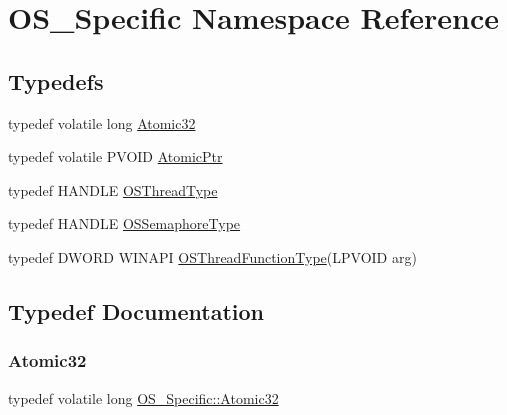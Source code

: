 \hypertarget{namespace_o_s___specific}{}\section{O\+S\+\_\+\+Specific Namespace Reference}
\label{namespace_o_s___specific}
\subsection*{Typedefs}
\begin{DoxyCompactItemize}
\item 
typedef volatile long \hyperlink{namespace_o_s___specific_ae0c154d740b3e6f81b245ff564b7d0ad}{Atomic32}
\item 
typedef volatile P\+V\+O\+ID \hyperlink{namespace_o_s___specific_ad9a39cdf74334e1457fda6bb1c4cb505}{Atomic\+Ptr}
\item 
typedef H\+A\+N\+D\+LE \hyperlink{namespace_o_s___specific_a965d89d27f3b632fa8d2d1b593bf2bd6}{O\+S\+Thread\+Type}
\item 
typedef H\+A\+N\+D\+LE \hyperlink{namespace_o_s___specific_a11a242d06d0e59bcf9525303bd7b3b57}{O\+S\+Semaphore\+Type}
\item 
typedef D\+W\+O\+RD W\+I\+N\+A\+PI \hyperlink{namespace_o_s___specific_a4a422b5e92e59f05440b9f9439cd349d}{O\+S\+Thread\+Function\+Type}(L\+P\+V\+O\+ID arg)
\end{DoxyCompactItemize}


\subsection{Typedef Documentation}
\mbox{\label{namespace_o_s___specific_ae0c154d740b3e6f81b245ff564b7d0ad}} 
\subsubsection{\texorpdfstring{Atomic32}{Atomic32}}
{\footnotesize\ttfamily typedef volatile long \hyperlink{namespace_o_s___specific_ae0c154d740b3e6f81b245ff564b7d0ad}{O\+S\+\_\+\+Specific\+::\+Atomic32}}

\mbox{\label{namespace_o_s___specific_ad9a39cdf74334e1457fda6bb1c4cb505}} 
